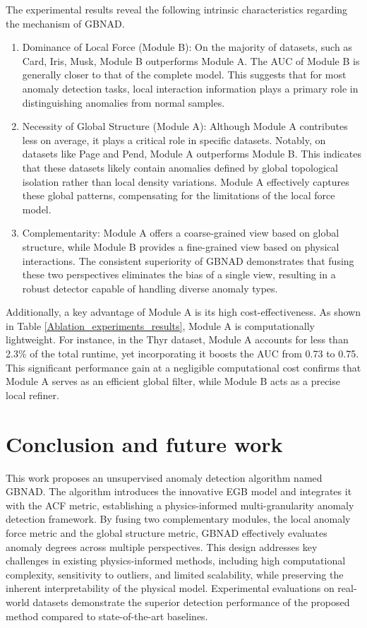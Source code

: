\documentclass[times, review, 10pt]{elsarticle}
\begin{document}
The experimental results reveal the following intrinsic characteristics regarding the mechanism of GBNAD.

\begin{enumerate}[\indent(1)]
    \item {Dominance of Local Force (Module B):} On the majority of datasets, such as {Card, Iris, Musk}, Module B outperforms Module A. The AUC of Module B is generally closer to that of the complete model. This suggests that for most anomaly detection tasks, local interaction information plays a primary role in distinguishing anomalies from normal samples.
    
    \item {Necessity of Global Structure (Module A):} Although Module A contributes less on average, it plays a critical role in specific datasets. Notably, on datasets like {Page} and {Pend}, Module A outperforms Module B. This indicates that these datasets likely contain anomalies defined by global topological isolation rather than local density variations. Module A effectively captures these global patterns, compensating for the limitations of the local force model.
    
    \item {Complementarity:} Module A offers a coarse-grained view based on global structure, while Module B provides a fine-grained view based on physical interactions. The consistent superiority of GBNAD demonstrates that fusing these two perspectives eliminates the bias of a single view, resulting in a robust detector capable of handling diverse anomaly types.
\end{enumerate}

Additionally, a key advantage of Module A is its high cost-effectiveness. As shown in Table \ref{Ablation_experiments_results}, Module A is computationally lightweight. For instance, in the {Thyr} dataset, Module A accounts for less than 2.3\% of the total runtime, yet incorporating it boosts the AUC from 0.73 to 0.75. This significant performance gain at a negligible computational cost confirms that Module A serves as an efficient global filter, while Module B acts as a precise local refiner.


\section{Conclusion and future work}
\label{Conclusion}
This work proposes an unsupervised anomaly detection algorithm named GBNAD. 
The algorithm introduces the innovative EGB model and integrates it with the ACF metric, establishing a physics-informed multi-granularity anomaly detection framework. 
By fusing two complementary modules, the local anomaly force metric and the global structure metric, GBNAD effectively evaluates anomaly degrees across multiple perspectives. 
This design addresses key challenges in existing physics-informed methods, including high computational complexity, sensitivity to outliers, and limited scalability, while preserving the inherent interpretability of the physical model.
Experimental evaluations on real-world datasets demonstrate the superior detection performance of the proposed method compared to state-of-the-art baselines. 
\end{document}

